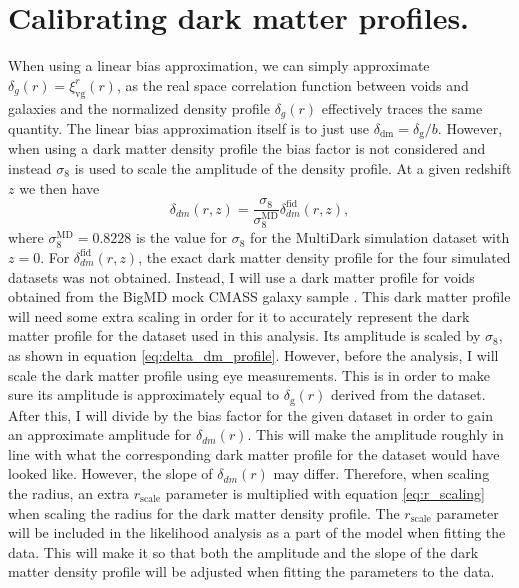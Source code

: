 \section{Calibrating dark matter profiles.}\label{sec:dm_calibrate}
When using a linear bias approximation, we can simply approximate $\delta_g(r)=\xi_{\mathrm{vg}}^r(r)$, as the real space correlation function between voids and galaxies and the normalized density profile $\delta_g(r)$ effectively traces the same quantity. The linear bias approximation itself is to just use $\delta_{\mathrm{dm}}=\delta_\mathrm{g}/b$. However, when using a dark matter density profile the bias factor is not considered and instead $\sigma_8$ is used to scale the amplitude of the density profile. At a given redshift $z$ we then have
\begin{equation}\label{eq:delta_dm_profile}
    \delta_{dm}(r,z) = \frac{\sigma_8}{\sigma_8^{\mathrm{MD}}}\delta_{dm}^\mathrm{fid}(r,z),
\end{equation}
where $\sigma_8^{\mathrm{MD}}=0.8228$ is the value for $\sigma_8$ for the MultiDark simulation dataset with $z=0$. For $\delta_{dm}^\mathrm{fid}(r,z)$, the exact dark matter density profile for the four simulated datasets was not obtained. Instead, I will use a dark matter profile for voids obtained from the BigMD mock CMASS galaxy sample \cite{Dawson_2012}. This dark matter profile will need some extra scaling in order for it to accurately represent the dark matter profile for the dataset used in this analysis. Its amplitude is scaled by $\sigma_8$, as shown in equation \ref{eq:delta_dm_profile}. However, before the analysis, I will scale the dark matter profile using eye measurements. This is in order to make sure its amplitude is approximately equal to $\delta_\mathrm{g}(r)$ derived from the dataset.  After this, I will divide by the bias factor for the given dataset in order to gain an approximate amplitude for $\delta_{dm}(r)$. This will make the amplitude roughly in line with what the corresponding dark matter profile for the dataset would have looked like. However, the slope of $\delta_{dm}(r)$ may differ. Therefore, when scaling the radius, an extra $r_\mathrm{scale}$ parameter is multiplied with equation \ref{eq:r_scaling} when scaling the radius for the dark matter density profile. The $r_\mathrm{scale}$ parameter will be included in the likelihood analysis as a part of the model when fitting the data. This will make it so that both the amplitude and the slope of the dark matter density profile will be adjusted when fitting the parameters to the data.
